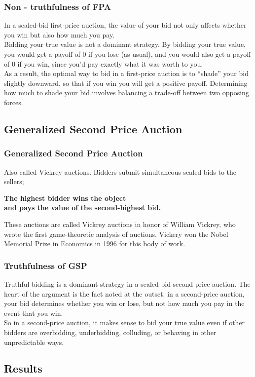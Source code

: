 \documentclass{beamer}
\begin{document}
\begin{frame}
\frametitle{Non - truthfulness of FPA}
In a sealed-bid first-price auction, the value of your bid not only affects whether you win but also how much you pay.\\
\medskip
Bidding your true value is not a dominant strategy. By bidding your true value, you would get a payoff of 0 if you lose (as usual), and you would also get a payoff of 0 if you win, since you’d pay exactly what it was worth to you.\\
\medskip
As a result, the optimal way to bid in a first-price auction is to “shade” your bid slightly downward, so that if you win you will get a positive payoff. Determining how much to shade your bid involves balancing a trade-off between two opposing forces.
\end{frame}

\subsection{Generalized Second Price Auction}
\begin{frame}
\frametitle{Generalized Second Price Auction}
Also called Vickrey auctions. Bidders submit simultaneous sealed bids to the sellers;
\begin{center} 
\textbf{The highest bidder wins the object \\
and pays the value of the second-highest bid.} 
\end{center}
These auctions are called Vickrey auctions in honor of William Vickrey, who wrote the first game-theoretic analysis of auctions. Vickery won the Nobel Memorial Prize in Economics in 1996 for this body of work.
\end{frame}

\begin{frame}
\frametitle{Truthfulness of GSP}
Truthful bidding is a dominant strategy in a sealed-bid second-price auction. The heart of the argument is the fact noted at the outset: in a second-price auction, your bid determines whether you win or lose, but not how much you pay in the event that you win. \\
\medskip
So in a second-price auction, it makes sense to bid your true value even if other bidders are overbidding, underbidding, colluding, or behaving in other unpredictable ways.
\end{frame}

\subsection{Results}
\end{document}
